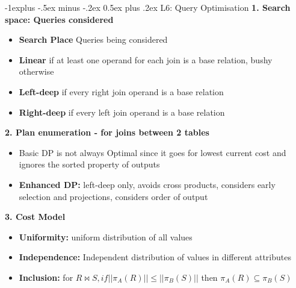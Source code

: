 \documentclass[10pt, landscape]{article}
\makeatletter
\renewcommand{\subsection}{\@startsection{subsection}{2}{0mm}%
                                {-1explus -.5ex minus -.2ex}%
                                {0.5ex plus .2ex}%
                                {\normalfont\normalsize\bfseries}}
\makeatother
\begin{document}
\begin{multicols}{4}


\subsection{L6: Query Optimisation}
\textbf{1. Search space: Queries considered} \\ 
\begin{itemize}
  \item \textbf{Search Place} Queries being considered
  \item \textbf{Linear} if at least one operand for each join is a base relation, bushy otherwise
  \item \textbf{Left-deep} if every right join operand is a base relation 
  \item \textbf{Right-deep} if every left join operand is a base relation
\end{itemize}

\textbf{2. Plan enumeration - for joins between 2 tables} \\
\begin{itemize}
  \item Basic DP is not always Optimal since it goes for lowest current cost and ignores the sorted property of outputs
  \item \textbf{Enhanced DP:} left-deep only, avoids cross products, considers early selection and projections, considers order of output
\end{itemize}

\textbf{3. Cost Model} \\
\begin{itemize}
  \item \textbf{Uniformity:} uniform distribution of all values
  \item \textbf{Independence:} Independent distribution of values in different attributes
  \item \textbf{Inclusion:} for $R\bowtie S, if ||\pi_A(R)|| \leq ||\pi_B(S)||$ then $\pi_A(R) \subseteq \pi_B(S)$
\end{itemize}


\end{multicols}
\end{document}
